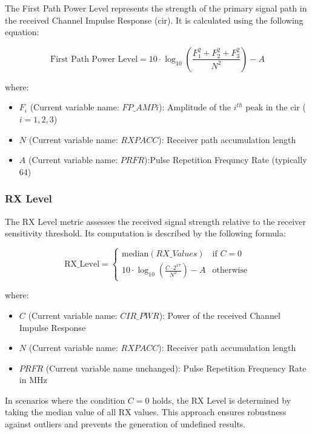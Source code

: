 The First Path Power Level represents the strength of the primary signal path in the received Channel Impulse Response (\gls{cir}). It is calculated using the following equation:

\begin{equation}
  \text{First Path Power Level} = 10 \cdot \log_{10} \left( \frac{F_1^2 + F_2^2 + F_3^2}{N^2} \right) - A
\end{equation}

where:

\begin{itemize}
  \item $F_i$ (Current variable name: $FP\_AMPi$): Amplitude of the $i^{th}$ peak in the \gls{cir} ($i = 1, 2, 3$)
  \item $N$ (Current variable name: $RXPACC$): Receiver path accumulation length
  \item $A$ (Current variable name: $PRFR$):Pulse Repetition Frequncy Rate (typically 64)
\end{itemize}

\subsubsection{RX Level}\label{rx_level}

The RX Level metric assesses the received signal strength relative to the receiver sensitivity threshold. Its computation is described by the following formula:

\begin{equation}
  \text{RX\_Level} =
  \begin{cases}
    \text{median}(RX\_Values) & \text{if } C = 0 \\
    10 \cdot \log_{10} \left( \frac{C \cdot 2^{17}}{N^2} \right) - A & \text{otherwise}
  \end{cases}
\end{equation}

where:

\begin{itemize}
  \item $C$ (Current variable name: $CIR\_PWR$): Power of the received Channel Impulse Response
  \item $N$ (Current variable name: $RXPACC$): Receiver path accumulation length
  \item $PRFR$ (Current variable name unchanged): Pulse Repetition Frequency Rate in MHz
\end{itemize}

In scenarios where the condition $C = 0$ holds, the RX Level is determined by taking the median value of all RX values. This approach ensures robustness against outliers and prevents the generation of undefined results.


